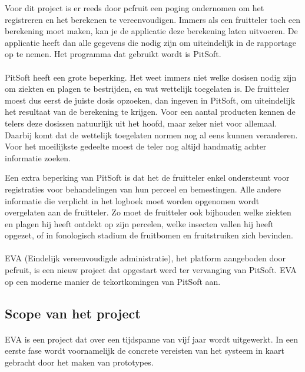 Voor dit project is er reeds door pcfruit een poging ondernomen om het registreren en het
berekenen te vereenvoudigen. Immers als een fruitteler toch een berekening moet maken, kan
je de applicatie deze berekening laten uitvoeren. De applicatie heeft dan alle gegevens
die nodig zijn om uiteindelijk in de rapportage op te nemen. Het programma dat gebruikt
wordt is PitSoft.

\paragraph {} PitSoft heeft een grote beperking. Het weet immers niet welke dosisen nodig
zijn om ziekten en plagen te bestrijden, en wat wettelijk toegelaten is. De fruitteler
moest dus eerst de juiste dosis opzoeken, dan ingeven in PitSoft, om uiteindelijk het
resultaat van de berekening te krijgen. Voor een aantal producten kennen de telers deze
dosissen natuurlijk uit het hoofd, maar zeker niet voor allemaal. Daarbij komt dat de
wettelijk toegelaten normen nog al eens kunnen veranderen. Voor het moeilijkste gedeelte
moest de teler nog altijd handmatig achter informatie zoeken.

Een extra beperking van PitSoft is dat het de fruitteler enkel ondersteunt voor
registraties voor behandelingen van hun perceel en bemestingen. Alle andere informatie die
verplicht in het logboek moet worden opgenomen wordt overgelaten aan de fruitteler. Zo
moet de fruitteler ook bijhouden welke ziekten en plagen hij heeft ontdekt op zijn
percelen, welke insecten vallen hij heeft opgezet, of in fonologisch stadium de
fruitbomen en fruitstruiken zich bevinden.

\paragraph {} EVA (Eindelijk vereenvoudigde administratie), het platform aangeboden door
pcfruit, is een nieuw project dat opgestart werd ter vervanging van PitSoft. EVA op een
moderne manier de tekortkomingen van PitSoft aan.


\subsection {Scope van het project}

\paragraph {} EVA is een project dat over een tijdspanne van vijf jaar wordt uitgewerkt.
In een eerste fase wordt voornamelijk de concrete vereisten van het systeem in kaart
gebracht door het maken van prototypes.

